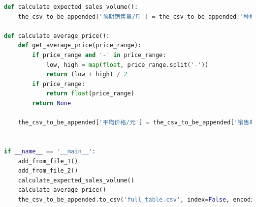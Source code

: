 \documentclass{cumcmthesis}
\begin{document}
\begin{appendices}
\begin{lstlisting}[language=python]
def calculate_expected_sales_volume():
    the_csv_to_be_appended['预期销售量/斤'] = the_csv_to_be_appended['种植面积/亩'] * the_csv_to_be_appended['亩产量/斤']

def calculate_average_price():
    def get_average_price(price_range):
        if price_range and '-' in price_range:
            low, high = map(float, price_range.split('-'))
            return (low + high) / 2
        if price_range:
            return float(price_range)
        return None
    
    the_csv_to_be_appended['平均价格/元'] = the_csv_to_be_appended['销售单价/(元/斤)'].apply(get_average_price)


if __name__ == '__main__':
    add_from_file_1()
    add_from_file_2()
    calculate_expected_sales_volume()
    calculate_average_price()
    the_csv_to_be_appended.to_csv('full_table.csv', index=False, encoding='utf-8-sig')


\end{lstlisting}


\end{appendices}
\end{document}
